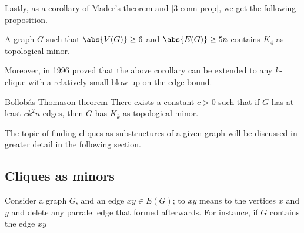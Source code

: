 \documentclass[a4paper, 12pt]{report}
\begin{document}
    Lastly, as a corollary of Mader's theorem and \cref{3-conn prop}, we get the following proposition.

    \begin{framedcor}{}
        A graph $G$ such that $\abs{V(G)} \ge 6$ and $\abs{E(G)} \ge 5n$ contains $K_4$ as topological minor.
    \end{framedcor}

    Moreover, in 1996 \textcite{bollobas} proved that the above corollary can be extended to any $k$-clique with a relatively small blow-up on the edge bound.

    \begin{framedthm}{Bollobás-Thomason theorem}
        There exists a constant $c > 0$ such that if $G$ has at least $ck^2n$ edges, then $G$ has $K_k$ as topological minor.
    \end{framedthm}

    The topic of finding cliques as substructures of a given graph will be discussed in greater detail in the following section.

    \subsection{Cliques as minors}

    Consider a graph $G$, and an edge $xy \in E(G)$; to  $xy$ means to  the vertices $x$ and $y$ and delete any parralel edge that formed afterwards. For instance, if $G$ contains the edge $xy$

    \begin{figure}[H]
        \centering
    \end{figure}
\end{document}
